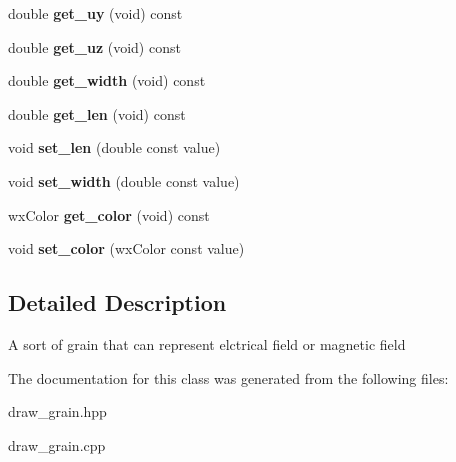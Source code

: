 \begin{CompactItemize}
\item 
double {\bf get\_\-uy} (void) const \label{classDraw__Grain_a14}

\item 
double {\bf get\_\-uz} (void) const \label{classDraw__Grain_a15}

\item 
double {\bf get\_\-width} (void) const \label{classDraw__Grain_a16}

\item 
double {\bf get\_\-len} (void) const \label{classDraw__Grain_a17}

\item 
void {\bf set\_\-len} (double const value)\label{classDraw__Grain_a18}

\item 
void {\bf set\_\-width} (double const value)\label{classDraw__Grain_a19}

\item 
wx\-Color {\bf get\_\-color} (void) const \label{classDraw__Grain_a20}

\item 
void {\bf set\_\-color} (wx\-Color const value)\label{classDraw__Grain_a21}

\end{CompactItemize}


\subsection{Detailed Description}
A sort of grain that can represent elctrical field or magnetic field 



The documentation for this class was generated from the following files:\begin{CompactItemize}
\item 
draw\_\-grain.hpp\item 
draw\_\-grain.cpp\end{CompactItemize}
